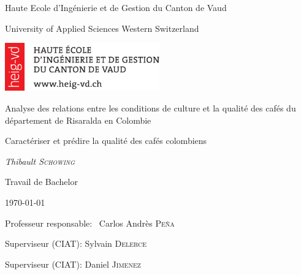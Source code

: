 \documentclass[11pt,a4paper]{report}
\author{Thibault Schowing}
\makeatletter
\newif\if@mainmatter \@mainmattertrue
\newcommand\frontmatter{%
	\cleardoublepage
	\@mainmatterfalse
	\pagenumbering{roman}}
\newcommand\blankpage{%
	\null
	\thispagestyle{empty}%
	\addtocounter{page}{-1}%
	\newpage}
\makeatother
\begin{document}
	
	
	\dominitoc

	\begin{titlepage}
		\centering
		
		\small{Haute Ecole d'Ingénierie et de Gestion du Canton de Vaud  \par}
		\footnotesize{University of Applied Sciences Western Switzerland\par}
		\vspace{1cm}
		
		\includegraphics[width=0.5\textwidth]{HEIG-VDLogo}\par
		
		\vspace{1cm}
		\Large{Analyse des relations entre les conditions de culture et la qualité des cafés du département de Risaralda en Colombie\par}
		\vspace{1.5cm}
		\small{Caractériser et prédire la qualité des cafés colombiens \par}
		\vspace{2cm}
		\small\textit{Thibault \textsc{Schowing}}\par
		\small{Travail de Bachelor}\par
		\small{\today\par}
		
		\vfill
		Professeur responsable: ~Carlos Andrès \textsc{Peña}\par
		Superviseur (CIAT): Sylvain \textsc{Delerce} \par
		Superviseur (CIAT): Daniel \textsc{Jimenez}
		
		
	\end{titlepage}
	
	\afterpage{\blankpage}
	
	\frontmatter
	
	
\end{document}
